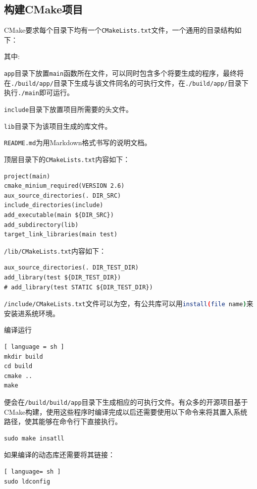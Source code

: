 		\subsection{构建CMake项目}
			\par CMake要求每个目录下均有一个\lstinline{CMakeLists.txt}文件，一个通用的目录结构如下：
			\par\noindent 其中:
			\par\noindent \lstinline{app}目录下放置\lstinline{main}函数所在文件，可以同时包含多个将要生成的程序，最终将在\lstinline{./build/app/}目录下生成与该文件同名的可执行文件，在\lstinline{./build/app/}目录下执行\lstinline{./main}即可运行。
			\par\noindent \lstinline{include}目录下放置项目所需要的头文件。
			\par\noindent \lstinline{lib}目录下为该项目生成的库文件。
			\par\noindent \lstinline{README.md}为用Markdown格式书写的说明文档。
			\par\noindent 顶层目录下的\lstinline{CMakeLists.txt}内容如下：
			\begin{lstlisting}
project(main)
cmake_minium_required(VERSION 2.6)
aux_source_directories(. DIR_SRC)
include_directories(include)
add_executable(main ${DIR_SRC})
add_subdirectory(lib)
target_link_libraries(main test)
			\end{lstlisting}
			\par\noindent \lstinline{/lib/CMakeLists.txt}内容如下：
			\begin{lstlisting}
aux_source_directories(. DIR_TEST_DIR)
add_library(test ${DIR_TEST_DIR})
# add_library(test STATIC ${DIR_TEST_DIR})
			\end{lstlisting}
			\par\noindent \lstinline{/include/CMakeLists.txt}文件可以为空，有公共库可以用\lstinline[language=sh]{install(file name)}来安装进系统环境。
			\par\noindent 编译运行
			\begin{lstlisting}[ language = sh ]
mkdir build
cd build
cmake ..
make
			\end{lstlisting}
			\par\noindent 便会在\lstinline{/build/build/app}目录下生成相应的可执行文件。有众多的开源项目基于CMake构建，使用这些程序时编译完成以后还需要使用以下命令来将其置入系统路径，使其能够在命令行下直接执行。
			\begin{lstlisting}
sudo make insatll
			\end{lstlisting}
			\par\noindent 如果编译的动态库还需要将其链接：
			\begin{lstlisting}[ language= sh ]
sudo ldconfig
			\end{lstlisting}
